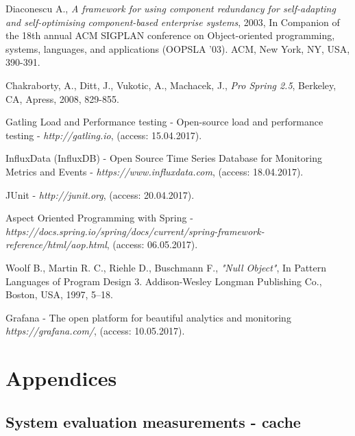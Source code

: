 \documentclass[12pt,a4paper]{article}
\begin{document}
\begin{thebibliography}{9}
Diaconescu A., \textit{A framework for using component redundancy for self-adapting and self-optimising component-based enterprise systems}, 2003, In Companion of the 18th annual ACM SIGPLAN conference on Object-oriented programming, systems, languages, and applications (OOPSLA '03). ACM, New York, NY, USA, 390-391. 

Chakraborty, A., Ditt, J., Vukotic, A., Machacek, J., \textit{Pro Spring 2.5}, Berkeley, CA, Apress, 2008, 829-855.  

Gatling Load and Performance testing - Open-source load and performance testing - \textit{http://gatling.io}, (access: 15.04.2017).

InfluxData (InfluxDB) - Open Source Time Series Database for Monitoring Metrics and Events - \textit{https://www.influxdata.com}, (access: 18.04.2017).


JUnit - \textit{http://junit.org}, (access: 20.04.2017).

Aspect Oriented Programming with Spring - \\
\textit{https://docs.spring.io/spring/docs/current/spring-framework-reference/html/aop.html}, (access: 06.05.2017).

Woolf B., Martin R. C., Riehle D., Buschmann F., \textit{"Null Object"}, In Pattern Languages of Program Design 3. Addison-Wesley Longman Publishing Co., Boston, USA, 1997, 5–18. 

Grafana - The open platform for beautiful analytics and monitoring \textit{https://grafana.com/}, (access: 10.05.2017).

\end{thebibliography}

\pagebreak
\clearpage
\section{Appendices} \label{section:appendices}

\appendix
\setcounter{table}{0}
\renewcommand{\thesubsection}{\Alph{subsection}}
\renewcommand{\thetable}{\Alph{subsection}.\numberwithin{table}{subsection}}

\subsection{System evaluation measurements - cache} \label{appendixcacheeval}
\end{document}
